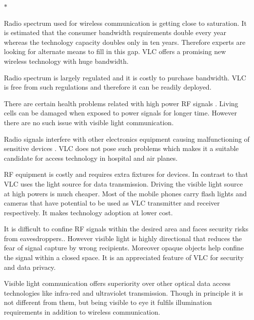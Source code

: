 \begin{list}{$\ast$}{}
\item Radio spectrum used for wireless communication is getting close to saturation. It is estimated that the consumer bandwidth requirements double every year whereas the technology capacity doubles only in ten years.  Therefore experts are looking for alternate means to fill in this gap. VLC offers a promising new wireless technology with huge bandwidth.

\item Radio spectrum is largely regulated and it is costly to purchase bandwidth. VLC is free from such regulations and therefore it can be readily deployed.

\item There are certain health problems related with high power RF signals \cite{szmigielski1982accelerated} \cite{agarwal2009effects} \cite{wdowiak2007evaluation}. Living cells can be damaged when exposed to power signals for longer time. However there are no such issue with visible light communication.

\item Radio signals interfere with other electronics equipment causing malfunctioning of sensitive devices \cite{robinson1997interference} \cite{van2008electromagnetic}. VLC does not pose such problems which makes it a suitable candidate for access technology in hospital and air planes. 

\item RF equipment is costly and requires extra fixtures for devices. In contrast to that VLC uses the light source for data transmission. Driving the visible light source at high powers is much cheaper. Most of the mobile phones carry flash lights and cameras that have potential to be used as VLC transmitter and receiver respectively. It makes technology adoption at lower cost.

\item It is difficult to confine RF signals within the desired area and faces security risks from eavesdroppers.\cite{racherla2000security}. However visible light is highly directional that reduces the fear of signal capture by wrong recipients. Moreover opaque objects help confine the signal within a closed space. It is an appreciated feature of VLC for security and data privacy.

\item Visible light communication offers superiority over other optical data access technologies like infra-red and ultraviolet transmission. Though in principle it is not different from them, but being visible to eye it fulfils illumination requirements in addition to wireless communication.


\end{list}
